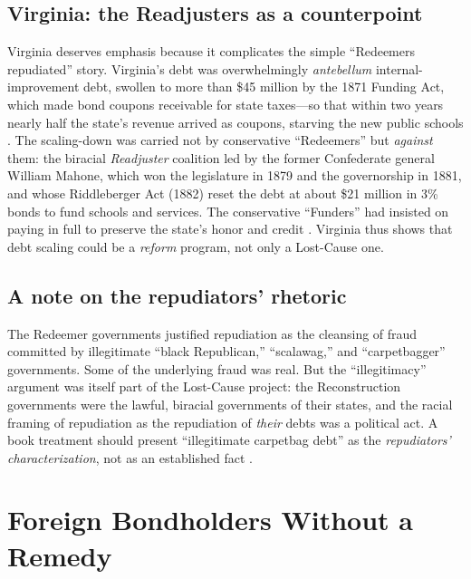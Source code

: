 \documentclass[12pt]{article}
\begin{document}
\subsection{Virginia: the Readjusters as a counterpoint}

Virginia deserves emphasis because it complicates the simple ``Redeemers
repudiated'' story. Virginia's debt was overwhelmingly \emph{antebellum}
internal-improvement debt, swollen to more than \$45 million by the 1871 Funding
Act, which made bond coupons receivable for state taxes---so that within two years
nearly half the state's revenue arrived as coupons, starving the new public
schools \citep{ev_debtcontroversy}. The scaling-down was carried not by conservative
``Redeemers'' but \emph{against} them: the biracial \emph{Readjuster} coalition led
by the former Confederate general William Mahone, which won the legislature in 1879
and the governorship in 1881, and whose Riddleberger Act (1882) reset the debt at
about \$21 million in 3\% bonds to fund schools and services. The conservative
``Funders'' had insisted on paying in full to preserve the state's honor and credit
\citep{moore1974twopaths, maddex1970virginia, ev_readjuster}. Virginia thus shows
that debt scaling could be a \emph{reform} program, not only a Lost-Cause one.

\subsection{A note on the repudiators' rhetoric}

The Redeemer governments justified repudiation as the cleansing of fraud committed
by illegitimate ``black Republican,'' ``scalawag,'' and ``carpetbagger''
governments. Some of the underlying fraud was real. But the ``illegitimacy''
argument was itself part of the Lost-Cause project: the Reconstruction governments
were the lawful, biracial governments of their states, and the racial framing of
repudiation as the repudiation of \emph{their} debts was a political act. A book
treatment should present ``illegitimate carpetbag debt'' as the \emph{repudiators'
characterization}, not as an established fact \citep{white2017republic,
woodward1951origins}.

\section{Foreign Bondholders Without a Remedy}
\label{sec:foreign}
\end{document}
